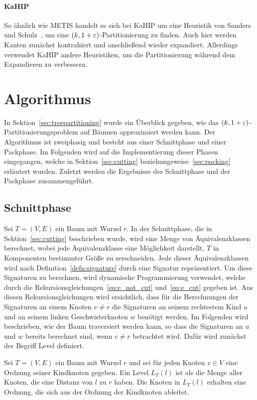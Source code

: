 \paragraph{KaHIP}
So ähnlich wie METIS handelt es sich bei KaHIP um eine Heuristik von Sanders und Schulz~\cite{SS13}, um eine $(k, 1 + \varepsilon)$\hyp Partitionierung zu finden.
Auch hier werden Kanten zunächst kontrahiert und anschließend wieder expandiert.
Allerdings verwendet KaHIP andere Heuristiken, um die Partitionierung während dem Expandieren zu verbessern.

\section{Algorithmus}
In Sektion~\ref{sec:treepartitioning} wurde ein Überblick gegeben, wie das $(k,1+\varepsilon)$\hyp Partitionierungsproblem auf Bäumen approximiert werden kann. 
Der Algorithmus ist zweiphasig und besteht aus einer Schnittphase und einer Packphase.
Im Folgenden wird auf die Implementierung dieser Phasen eingegangen, welche in Sektion~\ref{sec:cutting} beziehungsweise~\ref{sec:packing} erläutert wurden.
Zuletzt werden die Ergebnisse der Schnittphase und der Packphase zusammengeführt.

\subsection{Schnittphase}
Sei $T=(V,E)$ ein Baum mit Wurzel $r$.
In der Schnittphase, die in Sektion~\ref{sec:cutting} beschrieben wurde, wird eine Menge von Äquivalenzklassen berechnet, wobei jede Äquivalenzklasse eine Möglichkeit darstellt, $T$ in Komponenten bestimmter Größe zu zerschneiden.
Jede dieser Äquivalenzklassen wird nach Definition~\ref{defn:signature} durch eine Signatur repräsentiert.
Um diese Signaturen zu berechnen, wird dynamische Programmierung verwendet, welche durch die Rekursionsgleichungen~\eqref{eq:e_not_cut} und~\eqref{eq:e_cut} gegeben ist.
Aus diesen Rekursionsgleichungen wird ersichtlich, dass für die Berechnungen der Signaturen an einem Knoten $v \neq r$ die Signaturen an seinem rechtestem Kind $u$ und an seinem linken Geschwisterknoten $w$ benötigt werden.
Im Folgenden wird beschrieben, wie der Baum traversiert werden kann, so dass die Signaturen an $u$ und $w$ bereits berechnet sind, wenn $v \neq r$ betrachtet wird. 
Dafür wird zunächst der Begriff Level definiert. \\

\begin{defn}[Level]\label{def:level}
    Sei $T = (V,E)$ ein Baum mit Wurzel $r$ und sei für jeden Knoten $v \in V$ eine Ordnung seiner Kindknoten gegeben.
    Ein Level $L_T(l)$ ist als die Menge aller Knoten, die eine Distanz von $l$ zu $r$ haben.
    Die Knoten in $L_T(l)$ erhalten eine Ordnung, die sich aus der Ordnung der Kindknoten ableitet.
\end{defn}

